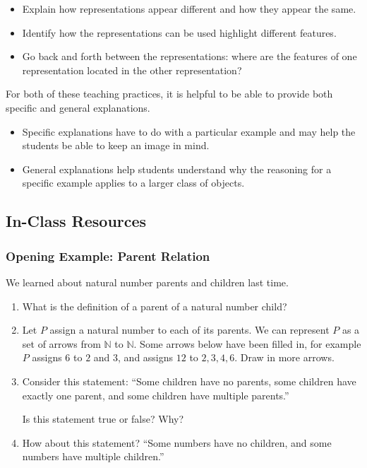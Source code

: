 \documentclass[11pt]{article}
\newcommand{\handout}{\subsubsection}
\newcommand\header[1]{\vspace*{4pt}\par {\large {\bf #1}}\par}
\newcommand{\N}{\mathbb{N}}
\theoremstyle{definition}
\begin{document}
\begin{itemize}
\item Explain how representations appear different and how they appear the same.
\item Identify how the representations can be used highlight different features. 
\item Go back and forth between the representations: where are the features of one representation located in the other representation?
\end{itemize}

For both of these teaching practices, it is helpful to be able to provide both specific and general explanations. 	\begin{itemize}
	\item Specific explanations have to do with a particular example and may help the students be able to keep an image in mind. 
	\item General explanations help students understand why the reasoning for a specific example applies to a larger class of objects.
	\end{itemize}


\newpage \subsection{In-Class Resources}  

\handout{Opening Example: Parent Relation}


We learned about natural number parents and children last time.

\begin{enumerate}
\item What is the definition of a parent of a natural number child? 
\item 
Let $P$ assign a natural number to each of its parents. We can represent $P$ as a set of arrows from $\N$ to $\N$.  Some arrows below have been filled in, for example $P$ assigns $6$ to $2$ and $3$, and assigns $12$ to $2, 3, 4, 6$.  Draw in more arrows.

\item Consider this statement: ``Some children have no parents, some children have exactly one parent, and some children have multiple parents.''  

Is this statement true or false? Why?

\item How about this statement? ``Some numbers have no children, and some numbers have multiple children.'' 
\end{enumerate}
\end{document}
